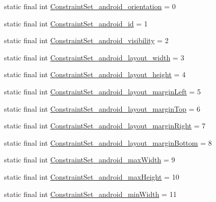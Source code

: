 \begin{DoxyCompactItemize}
\item 
static final int \mbox{\hyperlink{classandroid_1_1support_1_1constraint_1_1_r_1_1styleable_a5b993319add79b6a1e4cfe7d0b25d738}{Constraint\+Set\+\_\+android\+\_\+orientation}} = 0
\item 
static final int \mbox{\hyperlink{classandroid_1_1support_1_1constraint_1_1_r_1_1styleable_af1e0ad9da8f8e1d727b9a5b443ad31ee}{Constraint\+Set\+\_\+android\+\_\+id}} = 1
\item 
static final int \mbox{\hyperlink{classandroid_1_1support_1_1constraint_1_1_r_1_1styleable_a2c33d7ff7fa150efcbfb2e2da30ea366}{Constraint\+Set\+\_\+android\+\_\+visibility}} = 2
\item 
static final int \mbox{\hyperlink{classandroid_1_1support_1_1constraint_1_1_r_1_1styleable_ae4bfbc1227ca41b8f4ea92897b5687bf}{Constraint\+Set\+\_\+android\+\_\+layout\+\_\+width}} = 3
\item 
static final int \mbox{\hyperlink{classandroid_1_1support_1_1constraint_1_1_r_1_1styleable_aaee9b974cfb57692cca7a54f97ade5f5}{Constraint\+Set\+\_\+android\+\_\+layout\+\_\+height}} = 4
\item 
static final int \mbox{\hyperlink{classandroid_1_1support_1_1constraint_1_1_r_1_1styleable_a6f570437593261ace57cf0f1f24c67d7}{Constraint\+Set\+\_\+android\+\_\+layout\+\_\+margin\+Left}} = 5
\item 
static final int \mbox{\hyperlink{classandroid_1_1support_1_1constraint_1_1_r_1_1styleable_a51be68bffc4bb199bede3cf5e91a070d}{Constraint\+Set\+\_\+android\+\_\+layout\+\_\+margin\+Top}} = 6
\item 
static final int \mbox{\hyperlink{classandroid_1_1support_1_1constraint_1_1_r_1_1styleable_a6003ce07a1eaec8bb5db380b778ca50d}{Constraint\+Set\+\_\+android\+\_\+layout\+\_\+margin\+Right}} = 7
\item 
static final int \mbox{\hyperlink{classandroid_1_1support_1_1constraint_1_1_r_1_1styleable_adf19e921352fb16431c6a86577081249}{Constraint\+Set\+\_\+android\+\_\+layout\+\_\+margin\+Bottom}} = 8
\item 
static final int \mbox{\hyperlink{classandroid_1_1support_1_1constraint_1_1_r_1_1styleable_aab073db95bf92393b0a73e419b45f4d6}{Constraint\+Set\+\_\+android\+\_\+max\+Width}} = 9
\item 
static final int \mbox{\hyperlink{classandroid_1_1support_1_1constraint_1_1_r_1_1styleable_af5d33b78b726bae1ae60b2a227ae8307}{Constraint\+Set\+\_\+android\+\_\+max\+Height}} = 10
\item 
static final int \mbox{\hyperlink{classandroid_1_1support_1_1constraint_1_1_r_1_1styleable_a78fa1a230198989124a56f5d24dab17d}{Constraint\+Set\+\_\+android\+\_\+min\+Width}} = 11

\end{DoxyCompactItemize}
